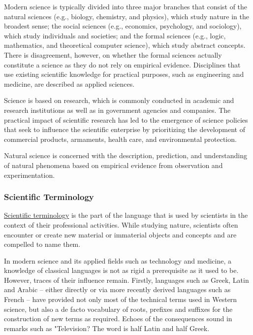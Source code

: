 \documentclass[
]{article}
\begin{document}
Modern science is typically divided into three major branches that
consist of the natural sciences (e.g., biology, chemistry, and physics),
which study nature in the broadest sense; the social sciences (e.g.,
economics, psychology, and sociology), which study individuals and
societies; and the formal sciences (e.g., logic, mathematics, and
theoretical computer science), which study abstract concepts. There is
disagreement, however, on whether the formal sciences actually
constitute a science as they do not rely on empirical evidence.
Disciplines that use existing scientific knowledge for practical
purposes, such as engineering and medicine, are described as applied
sciences.

Science is based on research, which is commonly conducted in academic
and research institutions as well as in government agencies and
companies. The practical impact of scientific research has led to the
emergence of science policies that seek to influence the scientific
enterprise by prioritizing the development of commercial products,
armaments, health care, and environmental protection.

Natural science is concerned with the description, prediction, and
understanding of natural phenomena based on empirical evidence from
observation and experimentation.

\hypertarget{scientific-terminology}{%
\subsubsection{Scientific Terminology}\label{scientific-terminology}}

\href{https://en.wikipedia.org/wiki/Scientific_terminology}{Scientific
terminology} is the part of the language that is used by scientists in
the context of their professional activities. While studying nature,
scientists often encounter or create new material or immaterial objects
and concepts and are compelled to name them.

In modern science and its applied fields such as technology and
medicine, a knowledge of classical languages is not as rigid a
prerequisite as it used to be. However, traces of their influence
remain. Firstly, languages such as Greek, Latin and Arabic -- either
directly or via more recently derived languages such as French -- have
provided not only most of the technical terms used in Western science,
but also a de facto vocabulary of roots, prefixes and suffixes for the
construction of new terms as required. Echoes of the consequences sound
in remarks such as "Television? The word is half Latin and half Greek.
\end{document}
